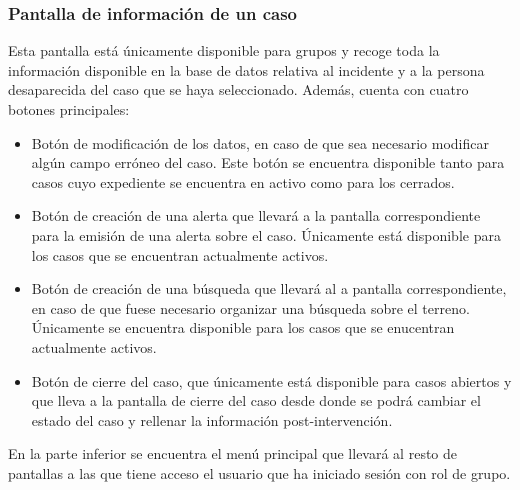      \subsubsection{Pantalla de información de un caso}
     Esta pantalla está únicamente disponible para grupos y recoge toda la información disponible en la base de datos relativa al incidente y a la persona desaparecida del caso que se haya seleccionado. Además, cuenta con cuatro botones principales:
     \begin{itemize}
         \item Botón de modificación de los datos, en caso de que sea necesario modificar algún campo erróneo del caso. Este botón se encuentra disponible tanto para casos cuyo expediente se encuentra en activo como para los cerrados.
         \item Botón de creación de una alerta que llevará a la pantalla correspondiente para la emisión de una alerta sobre el caso. Únicamente está disponible para los casos que se encuentran actualmente activos.
         \item Botón de creación de una búsqueda que llevará al a pantalla correspondiente, en caso de que fuese necesario organizar una búsqueda sobre el terreno. Únicamente se encuentra disponible para los casos que se enucentran actualmente activos.
         \item Botón de cierre del caso, que únicamente está disponible para casos abiertos y que lleva a la pantalla de cierre del caso desde donde se podrá cambiar el estado del caso y rellenar la información post-intervención.
     \end{itemize}
     
     En la parte inferior se encuentra el menú principal que llevará al resto de pantallas a las que tiene acceso el usuario que ha iniciado sesión con rol de grupo.



